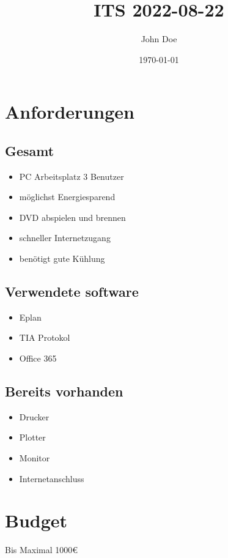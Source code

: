 \documentclass[11pt]{article}
\author{John Doe}
\date{\today}
\title{ITS 2022-08-22}
\begin{document}
\maketitle
\tableofcontents

\section{Anforderungen}
\label{sec:org0347be8}
\subsection{Gesamt}
\label{sec:orge5fdac4}
\begin{itemize}
\item PC Arbeitsplatz 3 Benutzer
\item möglichst Energiesparend
\item DVD abspielen und brennen
\item schneller Internetzugang
\item benötigt gute Kühlung
\end{itemize}

\subsection{Verwendete software}
\label{sec:org25bed69}
\begin{itemize}
\item Eplan
\item TIA Protokol
\item Office 365
\end{itemize}

\subsection{Bereits vorhanden}
\label{sec:org631daac}
\begin{itemize}
\item Drucker
\item Plotter
\item Monitor
\item Internetanschluss
\end{itemize}




\section{Budget}
\label{sec:orgb9d2181}
Bis Maximal 1000€
\end{document}
